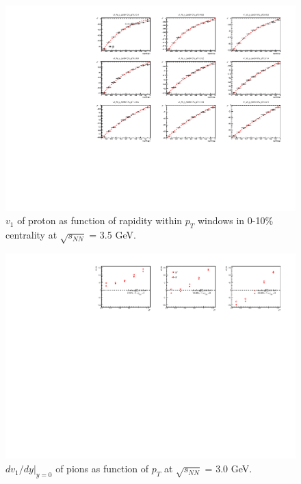 \begin{figure}[hbt!]
\centering
\includegraphics[width=0.85\linewidth]{figures/chapter03/3p5gev_protonp_v1VSy_9pT_cent2.pdf}
\caption{$v_1$ of proton as function of rapidity within $p_T$ windows in 0-10\% centrality at $\sqrt{s_{NN}}$ = 3.5 GeV.}
\label{fig:3p5gev_proton_v1y_pt_cent2}
\end{figure}

\begin{figure}[hbt!]
\centering
\includegraphics[width=0.95\linewidth]{figures/chapter03/3gev_pionp_v1Slope_pT.pdf}
\caption{$dv_1/dy|_{y=0}$ of pions as function of $p_T$ at $\sqrt{s_{NN}}$ = 3.0 GeV.}
\label{fig:3gev_pion_v1Slope_pt}
\end{figure}

